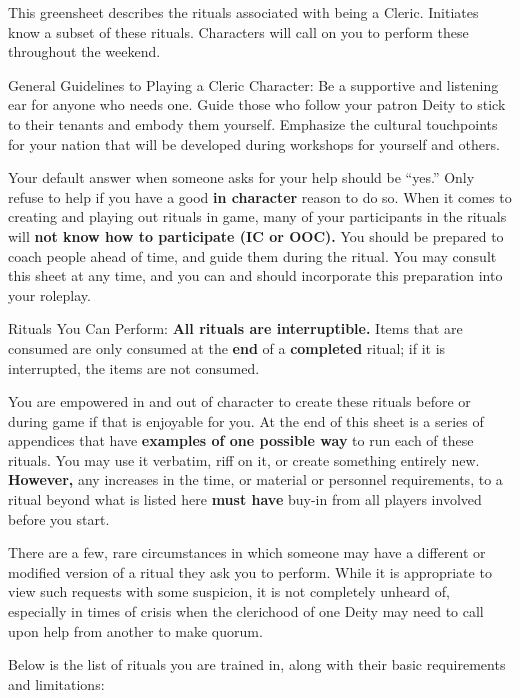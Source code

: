 \documentclass[green]{GL2020}
\begin{document}
\name{\gCoSCleric{}}

This greensheet describes the rituals associated with being a Cleric. Initiates know a subset of these rituals. Characters will call on you to perform these throughout the weekend. 

{\Large General Guidelines to Playing a Cleric Character:}
Be a supportive and listening ear for anyone who needs one. Guide those who follow your patron Deity to stick to their tenants and embody them yourself. Emphasize the cultural touchpoints for your nation that will be developed during workshops for yourself and others.

Your default answer when someone asks for your help should be ``yes.'' Only refuse to help if you have a good \textbf{in character} reason to do so. When it comes to creating and playing out rituals in game, many of your participants in the rituals will \textbf{not know how to participate (IC or OOC).} You should be prepared to coach people ahead of time, and guide them during the ritual. You may consult this sheet at any time, and you can and should incorporate this preparation into your roleplay.

{\Large Rituals You Can Perform:}
\textbf{All rituals are interruptible.} Items that are consumed are only consumed at the \textbf{end} of a \textbf{completed} ritual; if it is interrupted, the items are not consumed.

You are empowered in and out of character to create these rituals before or during game if that is enjoyable for you. At the end of this sheet is a series of appendices that have \textbf{examples of one possible way} to run each of these rituals. You may use it verbatim, riff on it, or create something entirely new. \textbf{However,} any increases in the time, or material or personnel requirements, to a ritual beyond what is listed here \textbf{must have} buy-in from all players involved before you start.

There are a few, rare circumstances in which someone may have a different or modified version of a ritual they ask you to perform. While it is appropriate to view such requests with some suspicion, it is not completely unheard of, especially in times of crisis when the clerichood of one Deity may need to call upon help from another to make quorum.

Below is the list of rituals you are trained in, along with their basic requirements and limitations:
\end{document}
